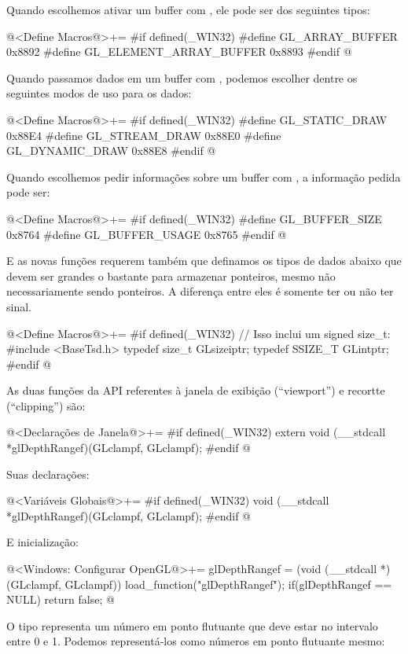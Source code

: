 Quando escolhemos ativar um buffer com , ele
pode ser dos seguintes tipos:

\iniciocodigo
@<Define Macros@>+=
#if defined(_WIN32)
#define GL_ARRAY_BUFFER         0x8892
#define GL_ELEMENT_ARRAY_BUFFER 0x8893
#endif
@
\fimcodigo

Quando passamos dados em um buffer com ,
podemos escolher dentre os seguintes modos de uso para os dados:

\iniciocodigo
@<Define Macros@>+=
#if defined(_WIN32)
#define GL_STATIC_DRAW  0x88E4
#define GL_STREAM_DRAW  0x88E0
#define GL_DYNAMIC_DRAW 0x88E8
#endif
@
\fimcodigo

Quando escolhemos pedir informações sobre um buffer
com , a informação pedida pode ser:

\iniciocodigo
@<Define Macros@>+=
#if defined(_WIN32)
#define GL_BUFFER_SIZE  0x8764
#define GL_BUFFER_USAGE 0x8765
#endif
@
\fimcodigo

E as novas funções requerem também que definamos os tipos de dados
abaixo que devem ser grandes o bastante para armazenar ponteiros,
mesmo não necessariamente sendo ponteiros. A diferença entre eles é
somente ter ou não ter sinal.

\iniciocodigo
@<Define Macros@>+=
#if defined(_WIN32)
// Isso inclui um signed size_t:
#include <BaseTsd.h>
typedef size_t GLsizeiptr;
typedef SSIZE_T GLintptr;
#endif
@
\fimcodigo

As duas funções da API referentes à janela de exibição (``viewport'')
e recortte (``clipping'') são:

\iniciocodigo
@<Declarações de Janela@>+=
#if defined(_WIN32)
extern void (__stdcall *glDepthRangef)(GLclampf, GLclampf);
#endif
@
\fimcodigo

Suas declarações:

\iniciocodigo
@<Variáveis Globais@>+=
#if defined(_WIN32)
void (__stdcall *glDepthRangef)(GLclampf, GLclampf);
#endif
@
\fimcodigo

E inicialização:

\iniciocodigo
@<Windows: Configurar OpenGL@>+=
glDepthRangef = (void (__stdcall *)(GLclampf, GLclampf))
                   load_function("glDepthRangef");
if(glDepthRangef == NULL) return false;
@
\fimcodigo

O tipo  representa um número em ponto flutuante
que deve estar no intervalo entre 0 e 1. Podemos representá-los como
números em ponto flutuante mesmo:

